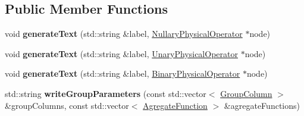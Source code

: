 \subsection*{Public Member Functions}
\begin{DoxyCompactItemize}
\item 
\hypertarget{class_physical_operator_drawing_visitor_a50acb8aae6d2b5fffff964f7d84b079f}{void {\bfseries generate\+Text} (std\+::string \&label, \hyperlink{class_nullary_physical_operator}{Nullary\+Physical\+Operator} $\ast$node)}\label{class_physical_operator_drawing_visitor_a50acb8aae6d2b5fffff964f7d84b079f}

\item 
\hypertarget{class_physical_operator_drawing_visitor_ab2637eab548a1c1d832a877363ede4a9}{void {\bfseries generate\+Text} (std\+::string \&label, \hyperlink{class_unary_physical_operator}{Unary\+Physical\+Operator} $\ast$node)}\label{class_physical_operator_drawing_visitor_ab2637eab548a1c1d832a877363ede4a9}

\item 
\hypertarget{class_physical_operator_drawing_visitor_a3abc3dcacc46a1004f7a9fb26f56154b}{void {\bfseries generate\+Text} (std\+::string \&label, \hyperlink{class_binary_physical_operator}{Binary\+Physical\+Operator} $\ast$node)}\label{class_physical_operator_drawing_visitor_a3abc3dcacc46a1004f7a9fb26f56154b}

\item 
\hypertarget{class_physical_operator_drawing_visitor_a4729d5a2f38e5318f44149942fb8e3c3}{std\+::string {\bfseries write\+Group\+Parameters} (const std\+::vector$<$ \hyperlink{class_group_column}{Group\+Column} $>$ \&group\+Columns, const std\+::vector$<$ \hyperlink{class_agregate_function}{Agregate\+Function} $>$ \&agregate\+Functions)}\label{class_physical_operator_drawing_visitor_a4729d5a2f38e5318f44149942fb8e3c3}


\end{DoxyCompactItemize}
